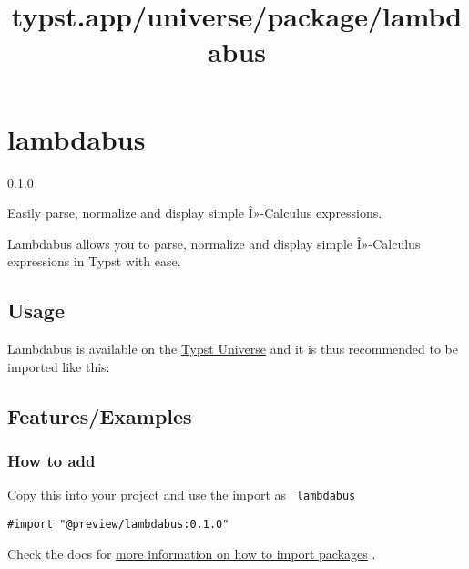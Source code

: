 \title{typst.app/universe/package/lambdabus}

\label{banner}
\section{lambdabus}\label{lambdabus}

{ 0.1.0 }

Easily parse, normalize and display simple Î»-Calculus expressions.

\label{readme}
Lambdabus allows you to parse, normalize and display simple Î»-Calculus
expressions in Typst with ease.

\subsection{Usage}\label{usage}

Lambdabus is available on the
\href{https://typst.app/universe/package/lambdabus/}{Typst Universe} and
it is thus recommended to be imported like this:

\begin{Shaded}
\begin{Highlighting}[]
\end{Highlighting}
\end{Shaded}

\subsection{Features/Examples}\label{featuresexamples}


\subsubsection{How to add}\label{how-to-add}

Copy this into your project and use the import as \texttt{\ lambdabus\ }

\begin{verbatim}
#import "@preview/lambdabus:0.1.0"
\end{verbatim}



Check the docs for
\href{https://typst.app/docs/reference/scripting/\#packages}{more
information on how to import packages} .

